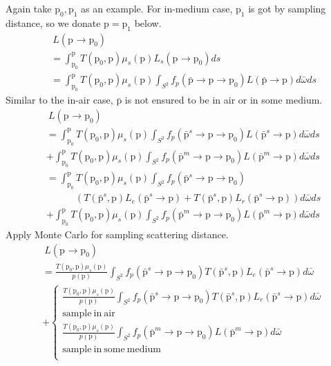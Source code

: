 \documentclass[acmtog]{acmart}
\def\w{\omega}
\def\p{\mathrm{p}}
\def\pp#1#2{\p_{#1}\rightarrow\p_{#2}}
\begin{document}
    Again take $\p_0,\p_1$ as an example.
    For in-medium case, $\p_1$ is got by sampling distance, so we donate $\p=\p_1$ below.
\begin{equation} \label{eq11}
\begin{split}
    &\ L(\pp{}{0})\\
    &= \int_{\p_0}^{\p}T(\p_0,\p)\mu_s(\p)L_s(\pp{}{0})ds\\
    &= \int_{\p_0}^{\p}T(\p_0,\p)\mu_s(\p)\int_{S^2}f_p(\bar{\p}\rightarrow\p\rightarrow\p_0)L(\bar{\p}\rightarrow\p)d\bar{\w}ds
\end{split}
\end{equation}
    Similar to the in-air case, $\bar{\p}$ is not ensured to be in air or in some medium.
\begin{equation} \label{eq12}
\begin{split}
    &\ L(\pp{}{0})\\
    &= \int_{\p_0}^{\p}T(\p_0,\p)\mu_s(\p)\int_{S^2}f_p(\bar{\p}^s\rightarrow\p\rightarrow\p_0)L(\bar{\p}^s\rightarrow\p)d\bar{\w}ds\\
    &+ \int_{\p_0}^{\p}T(\p_0,\p)\mu_s(\p)\int_{S^2}f_p(\bar{\p}^m\rightarrow\p\rightarrow\p_0)L(\bar{\p}^m\rightarrow\p)d\bar{\w}ds\\
    &= \int_{\p_0}^{\p}T(\p_0,\p)\mu_s(\p)\int_{S^2}f_p(\bar{\p}^s\rightarrow\p\rightarrow\p_0)\\
    &\quad\quad\quad \left(T(\bar{\p}^s,\p)L_e(\bar{\p}^s\rightarrow\p)+T(\bar{\p}^s,\p)L_r(\bar{\p}^s\rightarrow\p)\right)d\bar{\w}ds\\
    &+ \int_{\p_0}^{\p}T(\p_0,\p)\mu_s(\p)\int_{S^2}f_p(\bar{\p}^m\rightarrow\p\rightarrow\p_0)L(\bar{\p}^m\rightarrow\p)d\bar{\w}ds
\end{split}
\end{equation}
    Apply Monte Carlo for sampling scattering distance.
\begin{equation} \label{eq13}
\begin{split}
    &\ L(\pp{}{0})\\
    &= \frac{T(\p_0,\p)\mu_s(\p)}{p({\p})}\int_{S^2}f_p(\bar{\p}^s\rightarrow\p\rightarrow\p_0)T(\bar{\p}^s,\p)L_e(\bar{\p}^s\rightarrow\p)d\bar{\w}\\
    &+ \left\{\begin{aligned}
            \frac{T(\p_0,\p)\mu_s(\p)}{p({\p})}\int_{S^2}f_p(\bar{\p}^s\rightarrow\p\rightarrow\p_0)T(\bar{\p}^s,\p)L_r(\bar{\p}^s\rightarrow\p)d\bar{\w}\\
            \mathrm{sample\ in\ air}\\
            \frac{T(\p_0,\p)\mu_s(\p)}{p({\p})}\int_{S^2}f_p(\bar{\p}^m\rightarrow\p\rightarrow\p_0)L(\bar{\p}^m\rightarrow\p)d\bar{\w}\quad\quad\quad \\
            \mathrm{sample\ in\ some\ medium}\\
        \end{aligned}\right.
\end{split}
\end{equation}
\end{document}

